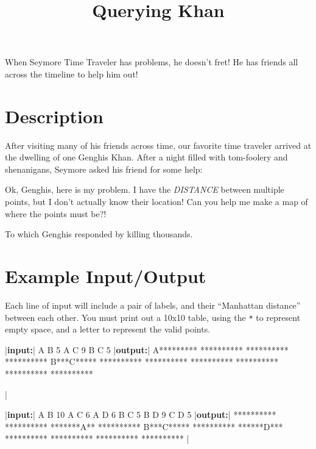 \documentclass{../codeproblem}
\begin{document}
\title{Querying Khan}


\begin{flavor}
  When Seymore Time Traveler has problems, he doesn't fret! He has
  friends all across the timeline to help him out!
\end{flavor}

\section*{Description}

After visiting many of his friends across time, our favorite time
traveler arrived at the dwelling of one Genghis Khan. After a night
filled with tom-foolery and shenanigans, Seymore asked his friend for
some help:
\begin{flavor}
  Ok, Genghis, here is my problem. I have the \emph{DISTANCE} between
  multiple points, but I don't actually know their location! Can you
  help me make a map of where the points must be?!
\end{flavor}
To which Genghis responded by killing thousands.

\section*{Example Input/Output}
Each line of input will include a pair of labels, and their
``Manhattan distance'' between each other. You must print out a 10x10
table, using the \texttt{*} to represent empty space, and a letter to
represent the valid points.

\begin{minipage}{.5\linewidth}
  \begin{example}
|\textbf{input:}|
A B 5
A C 9
B C 5
|\textbf{output:}|
A*********
**********
**********
**********
B***C*****
**********
**********
**********
**********
**********
**********



|\end{example}
\end{minipage}
\begin{minipage}{.5\linewidth}
\begin{example}
|\textbf{input:}|
A B 10 
A C 6
A D 6
B C 5
B D 9
C D 5
|\textbf{output:}|
**********
**********
*******A**
**********
B***C*****
**********
******D***
**********
**********
**********
**********
|\end{example}
\end{minipage}
\end{document}
